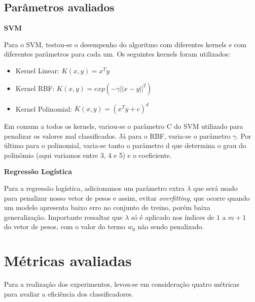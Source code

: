 \subsection{Parâmetros avaliados}
\label{subsec:parameters}

\textbf{SVM}

Para o SVM, testou-se o desempenho do algoritmo com diferentes kernels e com diferentes
parâmetros para cada um. Os seguintes kernels foram utilizados:

\begin{itemize}
	\item Kernel Linear: $K(x, y) = x^Ty$
	\item Kernel RBF: $K(x, y) = exp(-\gamma||x - y||^2)$
	\item Kernel Polinomial: $K(x, y) = (x^Ty + c)^d$
\end{itemize}

Em comum a todos os kernels, variou-se o parâmetro C do SVM utilizado para penalizar os valores
mal classificados. Já para o RBF, varia-se o parâmetro $\gamma$. Por último para o polinomial,
varia-se tanto o parâmetro d que determina o grau do polinômio (aqui variamos entre 3, 4 e 5) e o coeficiente.

\textbf{Regressão Logística}

Para a regressão logística, adicionamos um parâmetro extra $\lambda$ que será usado para penalizar
nosso vetor de pesos e assim, evitar \textit{overfitting}, que ocorre quando um modelo apresenta
baixo erro no conjunto de treino, porém baixa generalização. 
Importante ressaltar que $\lambda$ só é aplicado nos índices
de $1$ a $m + 1$ do vetor de pesos, com o valor do termo $w_0$ não sendo penalizado.


\section{Métricas avaliadas}

Para a realização dos experimentos, levou-se em consideração quatro métricas
para avaliar a eficiência dos classificadores.

